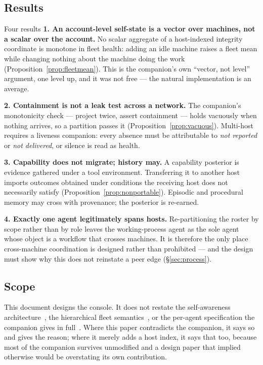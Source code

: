 \documentclass[11pt]{article}
\begin{document}
\subsection{Results}

\begin{claimbox}{Four results}
\textbf{1. An account-level self-state is a vector over machines, not a scalar over the account.} No scalar aggregate of a host-indexed integrity coordinate is monotone in fleet health: adding an idle machine raises a fleet mean while changing nothing about the machine doing the work (Proposition~\ref{prop:fleetmean}). This is the companion's own ``vector, not level'' argument, one level up, and it was not free --- the natural implementation is an average.

\textbf{2. Containment is not a leak test across a network.} The companion's monotonicity check --- project twice, assert containment --- holds vacuously when nothing arrives, so a partition passes it (Proposition~\ref{prop:vacuous}). Multi-host requires a liveness companion: every absence must be attributable to \emph{not reported} or \emph{not delivered}, or silence is read as health.

\textbf{3. Capability does not migrate; history may.} A capability posterior is evidence gathered under a tool environment. Transferring it to another host imports outcomes obtained under conditions the receiving host does not necessarily satisfy (Proposition~\ref{prop:nonportable}). Episodic and procedural memory may cross with provenance; the posterior is re-earned.

\textbf{4. Exactly one agent legitimately spans hosts.} Re-partitioning the roster by scope rather than by role leaves the working-process agent as the sole agent whose object is a workflow that crosses machines. It is therefore the only place cross-machine coordination is designed rather than prohibited --- and the design must show why this does not reinstate a peer edge (\S\ref{sec:process}).
\end{claimbox}

\subsection{Scope}

This document designs the console. It does not restate the self-awareness architecture~\citep{yang2026v2corrected,yang2026history}, the hierarchical fleet semantics~\citep{yang2026hierarchical,yang2026manager}, or the per-agent specification the companion gives in full~\citep{yang2026console}. Where this paper contradicts the companion, it says so and gives the reason; where it merely adds a host index, it says that too, because most of the companion survives unmodified and a design paper that implied otherwise would be overstating its own contribution.
\end{document}
